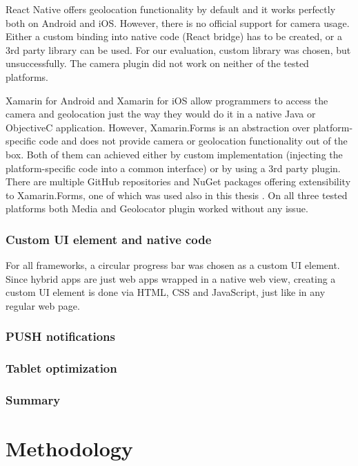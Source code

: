 \documentclass[english,master,public,dept460,male,cpdeclaration,oneside]{diploma}
\begin{document}
React Native offers geolocation functionality by default and it works perfectly both on Android and iOS. However, there is no official support for camera usage. Either a custom binding into native code (React bridge) has to be created, or a 3rd party library can be used. For our evaluation, custom library \cite{reactNativeCamera} was chosen, but unsuccessfully. The camera plugin did not work on neither of the tested platforms.

Xamarin for Android and Xamarin for iOS allow programmers to access the camera and geolocation just the way they would do it in a native Java or ObjectiveC application. However, Xamarin.Forms is an abstraction over platform-specific code and does not provide camera or geolocation functionality out of the box. Both of them can achieved either by custom implementation (injecting the platform-specific code into a common interface) or by using a 3rd party plugin. There are multiple GitHub repositories and NuGet packages offering extensibility to Xamarin.Forms, one of which was used also in this thesis \cite{xamarinPlugins}. On all three tested platforms both Media and Geolocator plugin worked without any issue. 

\subsubsection{Custom UI element and native code}
For all frameworks, a circular progress bar was chosen as a custom UI element. Since hybrid apps are just web apps wrapped in a native web view, creating a custom UI element is done via HTML, CSS and JavaScript, just like in any regular web page. 

\subsubsection{PUSH notifications}

\subsubsection{Tablet optimization}

\subsubsection{Summary}



\section{Methodology}
\end{document}
